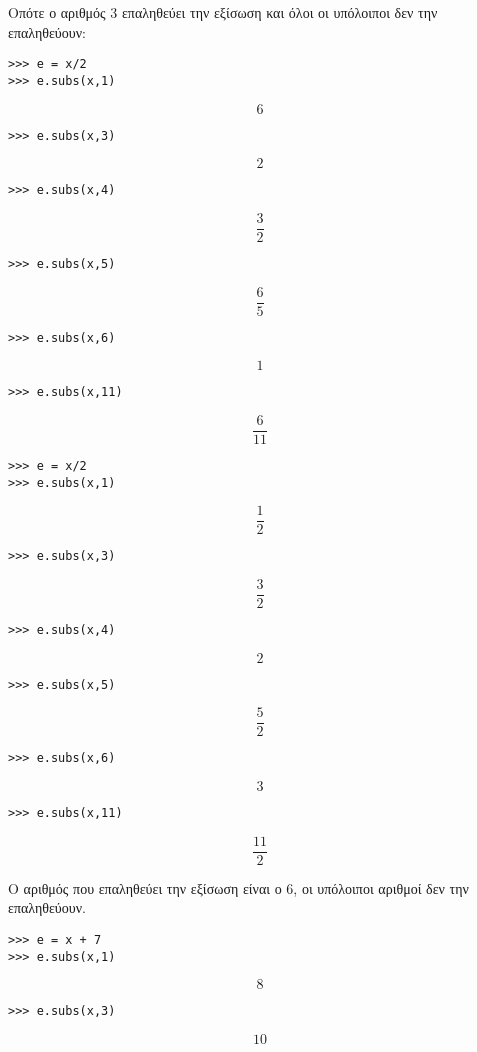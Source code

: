 Οπότε ο αριθμός 3 επαληθεύει την εξίσωση και όλοι οι υπόλοιποι δεν την επαληθεύουν:


\begin{lstlisting}
>>> e = x/2
>>> e.subs(x,1)
\end{lstlisting}
$$6$$
\begin{lstlisting}
>>> e.subs(x,3)
\end{lstlisting}
$$2$$
\begin{lstlisting}
>>> e.subs(x,4)
\end{lstlisting}
$$\frac{3}{2}$$
\begin{lstlisting}
>>> e.subs(x,5)
\end{lstlisting}
$$\frac{6}{5}$$
\begin{lstlisting}
>>> e.subs(x,6)
\end{lstlisting}
$$1$$
\begin{lstlisting}
>>> e.subs(x,11)
\end{lstlisting}
$$\frac{6}{11}$$

\begin{lstlisting}
>>> e = x/2
>>> e.subs(x,1)
\end{lstlisting}
$$\frac{1}{2}$$

\begin{lstlisting}
>>> e.subs(x,3)
\end{lstlisting}
$$\frac{3}{2}$$

\begin{lstlisting}
>>> e.subs(x,4)
\end{lstlisting}
$$2$$

\begin{lstlisting}
>>> e.subs(x,5)
\end{lstlisting}
$$\frac{5}{2}$$

\begin{lstlisting}
>>> e.subs(x,6)
\end{lstlisting}
$$3$$
\begin{lstlisting}
>>> e.subs(x,11)
\end{lstlisting}
$$\frac{11}{2}$$

Ο αριθμός που επαληθεύει την εξίσωση είναι ο 6, οι υπόλοιποι αριθμοί δεν την επαληθεύουν.

\begin{lstlisting}
>>> e = x + 7
>>> e.subs(x,1)
\end{lstlisting}
$$8$$

\begin{lstlisting}
>>> e.subs(x,3)
\end{lstlisting}
$$10$$

